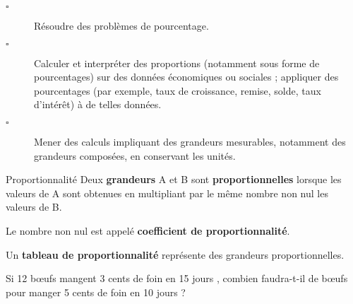 \documentclass[openany]{book}
\begin{document}
\begin{seance}[Proportionnalité]

\begin{description}
\item[$\square$] Résoudre des problèmes de pourcentage.
\item[$\square$] Calculer et interpréter des proportions (notamment sous forme de pourcentages) sur des données économiques ou sociales ; appliquer des pourcentages (par exemple, taux de croissance, remise, solde, taux d’intérêt) à de telles données.
\item[$\square$] Mener des calculs impliquant des grandeurs mesurables, notamment des grandeurs composées, en conservant les unités.
\end{description}
\end{seance}


\Exe



\begin{DefT}{Proportionnalité }
Deux \textbf{grandeurs} A et B sont  \textbf{proportionnelles} lorsque les valeurs de A sont obtenues en multipliant par le même nombre non nul les valeurs de B.

Le nombre non nul est appelé \textbf{coefficient de proportionnalité}.

Un \textbf{tableau de proportionnalité} représente des grandeurs proportionnelles.
\end{DefT}

\Exe



\Exe

Si 12 bœufs mangent 3 cents de foin en 15 jours , combien faudra-t-il de bœufs pour manger 5 cents de foin en 10 jours ?

%
%
\end{document}
